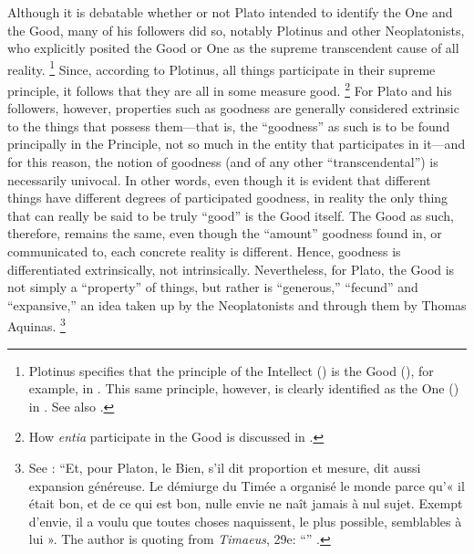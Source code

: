 %
Although it is debatable whether or not Plato intended to identify the One and the Good, many of his followers did so, notably Plotinus and other Neoplatonists, who explicitly posited the Good or One as the supreme transcendent cause of all reality.%
%
\footnote{Plotinus specifies that the principle of the Intellect () is the Good (), for example, in \cite[V,~1,~8.]{plotinus:enneads}. This same principle, however, is clearly identified as the One () in \cite[V,~1,~1]{plotinus:enneads}. See also \cite[VI,~7--9]{plotinus:enneads}.}
%
Since, according to Plotinus, all things participate in their supreme principle, it follows that they are all in some measure good.%
%
\footnote{How \emph{entia} participate in the Good is discussed in \cite[I, 7]{plotinus:enneads}.}
%
For Plato and his followers, however, properties such as goodness are generally considered extrinsic to the things that possess them---that is, the \enquote{goodness} as such is to be found principally in the Principle, not so much in the entity that participates in it---and for this reason, the notion of goodness (and of any other \enquote{transcendental}) is necessarily univocal. In other words, even though it is evident that different things have different degrees of participated goodness, in reality the only thing that can really be said to be truly \enquote{good} is the Good itself. The Good as such, therefore, remains the same, even though the ``amount'' goodness found in, or communicated to, each concrete reality is different. Hence, goodness is differentiated extrinsically, not intrinsically. Nevertheless, for Plato, the Good is not simply a ``property'' of things, but rather is ``generous,'' ``fecund'' and ``expansive,'' an idea taken up by the Neoplatonists and through them by Thomas Aquinas.%
%
\footnote{See \cite[62]{definance:etre-et-agir}: ``Et, pour Platon, le Bien, s'il dit proportion et mesure, dit aussi expansion généreuse. Le démiurge du Timée a organisé le monde parce qu'« il était bon, et de ce qui est bon, nulle envie ne naît jamais à nul sujet. Exempt d'envie, il a voulu que toutes choses naquissent, le plus possible, semblables à lui ». The author is quoting from \emph{Timaeus}, 29e: ``'' \parencite{plato:timaeus}.}
%

